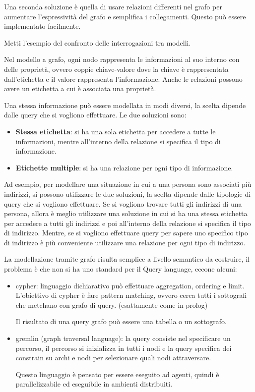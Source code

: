 Una seconda soluzione è quella di usare relazioni differenti nel grafo per aumentare
l'espressività del grafo e semplifica i collegamenti. Questo può essere implementato
facilmente.

\begin{esempio}
      Metti l'esempio del confronto delle interrogazioni tra modelli.
\end{esempio}

Nel modello a grafo, ogni nodo rappresenta le informazioni al suo interno con 
delle proprietà, ovvero coppie chiave-valore dove la chiave è rappresentata 
dall'etichetta e il valore rappresenta l'informazione. Anche le relazioni possono
avere un etichetta a cui è associata una proprietà.

Una stessa informazione può essere modellata in modi diversi, la scelta dipende
dalle query che si vogliono effettuare. Le due soluzioni sono:
\begin{itemize}
      \item \textbf{Stessa etichetta}: si ha una sola etichetta per accedere
            a tutte le informazioni, mentre all'interno della relazione si specifica
            il tipo di informazione.
      \item \textbf{Etichette multiple}: si ha una relazione per ogni tipo di
            informazione.
\end{itemize}
Ad esempio, per modellare una situazione in cui a una persona sono associati più
indirizzi, si possono utilizzare le due soluzioni, la scelta dipende dalle 
tipologie di query che si vogliono effettuare. Se si vogliono trovare tutti 
gli indirizzi di una persona, allora è meglio utilizzare una soluzione in cui 
si ha una stessa etichetta per accedere a tutti gli indirizzi e poi all'interno 
della relazione si specifica il tipo di indirizzo. Mentre, se si vogliono 
effettuare query per sapere uno specifico tipo di indirizzo è più conveniente
utilizzare una relazione per ogni tipo di indirizzo. 

La modellazione tramite grafo risulta semplice a livello semantico da costruire,
il problema è che non si ha uno standard per il Query language, eccone alcuni:
\begin{itemize}
      \item cypher: linguaggio dichiarativo può effettuare aggregation, ordering
      e limit. L'obiettivo di cypher è fare pattern matching, ovvero cerca tutti 
      i sottografi che metchano con grafo di query. (esattamente come in prolog)

      Il risultato di una query grafo può essere una tabella o un sottografo.
      \item gremlin (graph traversal language): la query consiste nel specificare 
      un percorso, il percorso si inizializza in tutti i nodi e la query specifica
      dei constrain su archi e nodi per selezionare quali nodi attraversare. 

      Questo linguaggio è pensato per essere eseguito ad agenti, quindi è parallelizzabile
      ed eseguibile in ambienti distribuiti.
\end{itemize}

